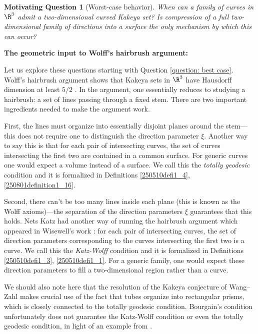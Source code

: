 \documentclass{article}
\numberwithin{equation}{section}
\theoremstyle{plain}
\newtheorem{motivatingquestion}[theorem]{Motivating Question}
\begin{document}
\begin{motivatingquestion}[Worst-case behavior]\label{question: worst case}
    When can a family of curves in $\R^3$ admit a two-dimensional curved Kakeya set? Is compression of a full two-dimensional family of directions into a surface the only mechanism by which this can occur?
\end{motivatingquestion}

\noindent \textbf{The geometric input to Wolff's hairbrush argument:}

Let us explore these questions starting with Question \ref{question: best case}. Wolff's hairbrush argument shows that Kakeya sets in $\R^3$ have Hausdorff dimension at least $5/2$ \cite{Wol95}. In the argument, one essentially reduces to studying a hairbrush: a set of lines passing through a fixed stem. There are two important ingredients needed to make the argument work. 

First, the lines must organize into essentially disjoint planes around the stem---this does not require one to distinguish the direction parameter $\xi$. Another way to say this is that for each pair of intersecting curves, the set of curves intersecting the first two are contained in a common surface. For generic curves one would expect a volume instead of a surface. We call this the \emph{totally geodesic} condition and it is formalized in Definitions \ref{250510defi1_4}, \ref{250801definition1_16}. 

Second, there can't be too many lines inside each plane (this is known as the Wolff axioms)---the separation of the direction parameters $\xi$ guarantees that this holds. Nets Katz had another way of running the hairbrush argument which appeared in Wisewell's work \cite{Wis05}: for each pair of intersecting curves, the set of direction parameters corresponding to the curves intersecting the first two is a curve. We call this the \emph{Katz-Wolff} condition and it is formalized in Definitions \ref{250510defi1_3}, \ref{250510defi1_1}. For a generic family, one would expect these direction parameters to fill a two-dimensional region rather than a curve. 

We should also note here that the resolution of the Kakeya conjecture of Wang--Zahl makes crucial use of the fact that tubes organize into rectangular prisms, which is closely connected to the totally geodesic condition. 
Bourgain's condition unfortunately does not guarantee the Katz-Wolff condition or even the totally geodesic condition, in light of an example from \cite{nadjimzadah2026bourgainsconditionstickykakeya}. 
\end{document}
